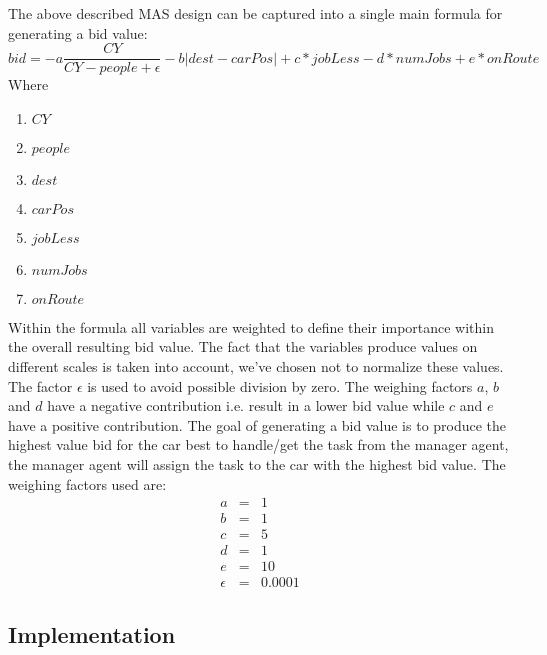 \documentclass[a4paper,11pt]{article}
\begin{document}
The above described MAS design can be captured into a single main formula for generating a bid value:
\newline
\[bid = -a\frac{CY}{CY-people+\epsilon} - b|dest - carPos| + c*jobLess - d*numJobs + e*onRoute\]
\newline\newline
Where
\begin{enumerate}
	\item[] $CY$
	\item[] $people$
	\item[] $dest$ 
	\item[] $carPos$  
	\item[] $jobLess$ 
	\item[] $numJobs$
	\item[] $onRoute$ 
\end{enumerate}

Within the formula all variables are weighted to define their importance within the overall resulting bid value. The fact that the variables produce values on different scales is taken into account, we've chosen not to normalize these values. The factor $\epsilon$ is used to avoid possible division by zero. The weighing factors $a$, $b$ and $d$ have a negative contribution i.e. result in a lower bid value while $c$ and $e$ have a positive contribution. The goal of generating a bid value is to produce the highest value bid for the car best to handle/get the task from the manager agent, the manager agent will assign the task to the car with the highest bid value. The weighing factors used are:
\[\begin{array}{lcl}
a & = & 1\\
b & = & 1\\
c & = & 5\\
d & = & 1\\
e & = & 10\\
\epsilon & = & 0.0001
\end{array}\]

\subsection{Implementation}
\end{document}
